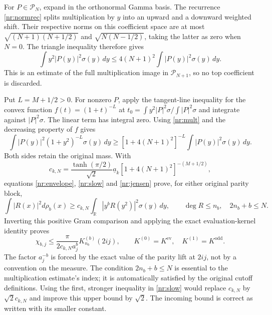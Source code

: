 \documentclass[11pt]{article}
\newcommand{\R}{\mathbb R}
\newcommand{\Pcal}{\mathcal P}
\begin{document}
For $P\in\Pcal_N$, expand in the orthonormal Gamma basis.
The recurrence \eqref{nr:normrec} splits multiplication by $y$
into an upward and a downward weighted shift. Their respective norms
on this coefficient space are at most
$\sqrt{(N+1)(N+1/2)}$ and $\sqrt{N(N-1/2)}$, taking the latter
as zero when $N=0$. The triangle inequality therefore gives
\begin{equation}\tag{NR22}\label{nr:mult}
 \int y^2|P(y)|^2\sigma(y)\,dy
 \le4(N+1)^2\int|P(y)|^2\sigma(y)\,dy.
\end{equation}
This is an estimate of the full multiplication image in
$\Pcal_{N+1}$, so no top coefficient is discarded.

Put $L=M+1/2>0$. For nonzero $P$, apply the tangent-line inequality
for the convex function $f(t)=(1+t)^{-L}$ at
$t_0=\int y^2|P|^2\sigma/\int|P|^2\sigma$ and integrate against
$|P|^2\sigma$. The linear term has integral zero. Using
\eqref{nr:mult} and the decreasing property of $f$ gives
\begin{equation}\tag{NR23}\label{nr:jensen}
 \int|P(y)|^2(1+y^2)^{-L}\sigma(y)\,dy
 \ge[1+4(N+1)^2]^{-L}\int|P(y)|^2\sigma(y)\,dy.
\end{equation}
Both sides retain the original mass. With
\begin{equation}\tag{NR24}\label{nr:lowerconstant}
 c_{k,N}=\frac{\tanh(\pi/2)}{\sqrt2}\underline a_k
        [1+4(N+1)^2]^{-(M+1/2)},
\end{equation}
equations \eqref{nr:envelope}, \eqref{nr:slow} and
\eqref{nr:jensen} prove, for either original parity block,
\begin{equation}\tag{NR25}\label{nr:gramlower}
 \int|R(x)|^2d\rho_b(x)
 \ge c_{k,N}\int_\R|y^bR(y^2)|^2\sigma(y)\,dy,
 \qquad \deg R\le n_b,\quad 2n_b+b\le N.
\end{equation}
Inverting this positive Gram comparison and applying the exact
evaluation-kernel identity proves
\begin{equation}\tag{NR26}\label{nr:chi}
 \boxed{\chi_{b,j}\le
 \frac{\pi}{2c_{k,N}a_j^b}K_{n_b}^{(b)}(2ij),\qquad
 K^{(0)}=K^{\mathrm{ev}},\quad K^{(1)}=K^{\mathrm{odd}}.}
\end{equation}
The factor $a_j^{-b}$ is forced by the exact value of the parity
lift at $2ij$, not by a convention on the measure. The condition
$2n_b+b\le N$ is essential to the multiplication estimate's index;
it is automatically satisfied by the original cutoff definitions.
Using the first, stronger inequality in \eqref{nr:slow} would
replace $c_{k,N}$ by $\sqrt2c_{k,N}$ and improve this upper bound
by $\sqrt2$. The incoming bound is correct as written with its
smaller constant.
\end{document}
